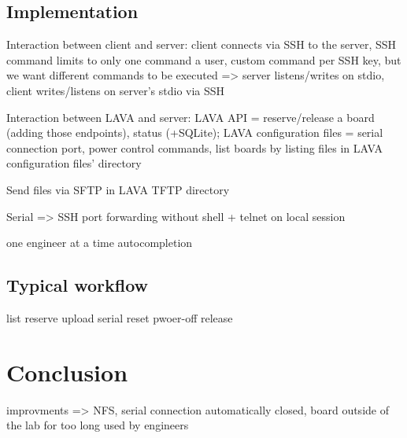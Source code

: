 \subsection{Implementation}

Interaction between client and server: client connects via SSH to the server, SSH command limits to only one command a user, custom command per SSH key, but we want different commands to be executed => server listens/writes on stdio, client writes/listens on server's stdio via SSH

Interaction between LAVA and server: LAVA API = reserve/release a board (adding those endpoints), status (+SQLite); LAVA configuration files = serial connection port, power control commands, list boards by listing files in LAVA configuration files' directory

Send files via SFTP in LAVA TFTP directory

Serial => SSH port forwarding without shell + telnet on local session

one engineer at a time
autocompletion

\subsection{Typical workflow}

list
reserve
upload
serial
reset
pwoer-off
release

\section{Conclusion}
improvments => NFS, serial connection automatically closed, board outside of the lab for too long 
used by engineers
